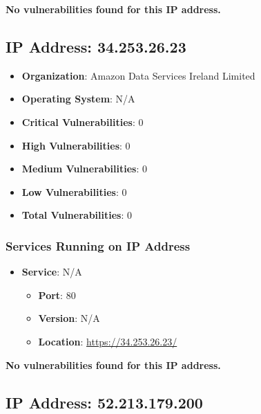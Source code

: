 \documentclass{article}
\begin{document}
\textbf{No vulnerabilities found for this IP address.}




\clearpage



\subsection{IP Address: 34.253.26.23}

\begin{itemize}
    \item \textbf{Organization}: Amazon Data Services Ireland Limited
    \item \textbf{Operating System}:  N/A 
    \item \textbf{Critical Vulnerabilities}: 0
    \item \textbf{High Vulnerabilities}: 0
    \item \textbf{Medium Vulnerabilities}: 0
    \item \textbf{Low Vulnerabilities}: 0
    \item \textbf{Total Vulnerabilities}: 0
\end{itemize}

\subsubsection*{Services Running on IP Address}

\begin{itemize}
    
        \item \textbf{Service}: N/A
        \begin{itemize}
            \item \textbf{Port}: 80
            \item \textbf{Version}:  N/A 
            \item \textbf{Location}: \href{ https://34.253.26.23/ }{ https://34.253.26.23/ }
        \end{itemize}
    
\end{itemize}


\textbf{No vulnerabilities found for this IP address.}




\clearpage



\subsection{IP Address: 52.213.179.200}
\end{document}
